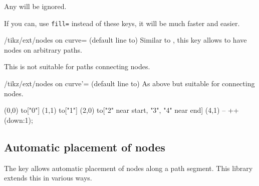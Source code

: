 \begin{multicols}{2}
Any  will be ignored.

If you can, use \texttt{fill=}
instead of these keys, it will be much faster and easier.

\begin{stylekey}{/tikz/ext/nodes on curve= (default line to)}
Similar to , this key allows
to have nodes on arbitrary paths.

This is not suitable for paths connecting nodes.
\end{stylekey}

\begin{stylekey}{/tikz/ext/nodes on curve'= (default line to)}
As above but suitable for connecting nodes.
\end{stylekey}

\begin{codeexample}[preamble=\usetikzlibrary{ext.nodes, intersections, quotes, spath3}]
\end{codeexample}
\begin{codeexample}[preamble=\usetikzlibrary{ext.nodes, intersections, quotes, spath3}]
\tikz[inner sep=.15em, circle, nodes={draw, green}, sloped, ultra thick]
  \draw[->, ext/nodes on curve=bend left] (0,0) to["0"] (1,1)
                                                to["1"] (2,0)
                  to["2" near start, "3", "4" near end] (4,1)
                                                -- ++(down:1);
\end{codeexample}

\subsection{Automatic placement of nodes}
The  key allows automatic placement of
nodes along a path segment.
This library extends this in various ways.


\end{multicols}
